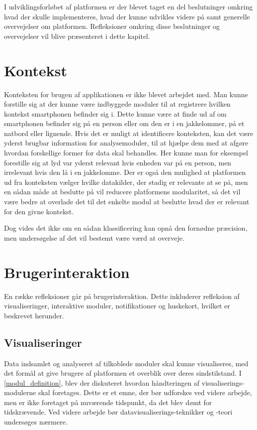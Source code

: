 I udviklingsforløbet af platformen er der blevet taget en del beslutninger omkring hvad der skulle implementeres, hvad der kunne udvikles videre på samt generelle overvejelser om platformen.
Refleksioner omkring disse beslutninger og overvejelser vil blive præsenteret i dette kapitel.

\section{Kontekst}
Konteksten for brugen af applikationen er ikke blevet arbejdet med.
Man kunne forstille sig at der kunne være indbyggede moduler til at registrere hvilken kontekst smartphonen befinder sig i.
Dette kunne være at finde ud af om smartphonen befinder sig på en person eller om den er i en jakkelommer, på et natbord eller lignende.
Hvis det er muligt at identificere konteksten, kan det være yderst brugbar information for analysemoduler, til at hjælpe dem med at afgøre hvordan forskellige former for data skal behandles.
Her kunne man for eksempel forestille sig at lyd var yderst relevant hvis enheden var på en person, men irrelevant hvis den lå i en jakkelomme.
Der er også den mulighed at platformen ud fra konteksten vælger hvilke datakilder, der stadig er relevante at se på, men en sådan måde at beslutte på vil reducere platformens modularitet, så det vil være bedre at overlade det til det enkelte modul at beslutte hvad der er relevant for den givne kontekst.

Dog vides det ikke om en sådan klassificering kan opnå den fornødne præcision, men undersøgelse af det vil bestemt være værd at overveje.

\section{Brugerinteraktion}
En række refleksioner går på brugerinteraktion.
Dette inkluderer refleksion af visualiseringer, interaktive moduler, notifikationer og huskekort, hvilket er beskrevet herunder.

\subsection{Visualiseringer}
Data indsamlet og analyseret af tilkoblede moduler skal kunne visualiseres, med det formål at give brugere af platformen et overblik over deres sindstilstand.
I \cref{modul_definition}, blev der diskuteret hvordan håndteringen af visualiserings-modulerne skal foretages.
Dette er et emne, der bør udforskes ved videre arbejde, men er ikke foretaget på nuværende tidspunkt, da det blev dømt for tidskrævende.
Ved videre arbejde bør datavisualiserings-teknikker og -teori undersøges nærmere.


